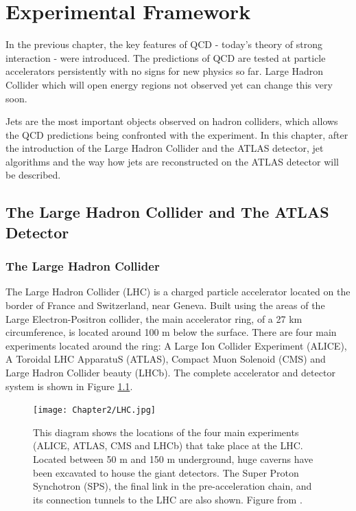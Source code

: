 \chapter{Experimental Framework}


In the previous chapter, the key features of QCD - today's theory of strong
interaction - were introduced. The predictions of QCD are tested at particle
accelerators persistently with no signs for new physics so far. Large Hadron
Collider which will open energy regions not observed yet can change this very
soon.

Jets are the most important objects observed on hadron colliders, which allows
the QCD predictions being confronted with the experiment. In this chapter, after
the introduction of the Large Hadron Collider and the ATLAS detector, jet
algorithms and the way how jets are reconstructed on the ATLAS detector will be
described.

\section{The Large Hadron Collider and The ATLAS Detector}

\subsection{The Large Hadron Collider}

The Large Hadron Collider (LHC) \cite{LHC, LHCPastPresentFuture} is a charged
particle accelerator located on the border of France and Switzerland, near
Geneva. Built using the areas of the Large Electron-Positron collider, the main
accelerator ring, of a 27 km circumference, is located around 100 m below the
surface. There are four main experiments located around the ring: A Large Ion
Collider Experiment (ALICE), A Toroidal LHC ApparatuS (ATLAS), Compact Muon
Solenoid (CMS) and Large Hadron Collider beauty (LHCb). The complete accelerator
and detector system is shown in Figure \ref{fig:LHC}.

\begin{figure}[t]
  \centering
  \texttt{[image: Chapter2/LHC.jpg]}
  \caption{This diagram shows the locations of the four main experiments (ALICE,
    ATLAS, CMS and LHCb) that take place at the LHC. Located between 50 m and
    150 m underground, huge caverns have been excavated to house the giant
    detectors. The Super Proton Synchotron (SPS), the final link in the
    pre-acceleration chain, and its connection tunnels to the LHC are also
    shown.  Figure from \cite{CERN:ATLASexperimentPictureswiki}.  }
  \label{fig:LHC}
\end{figure}

